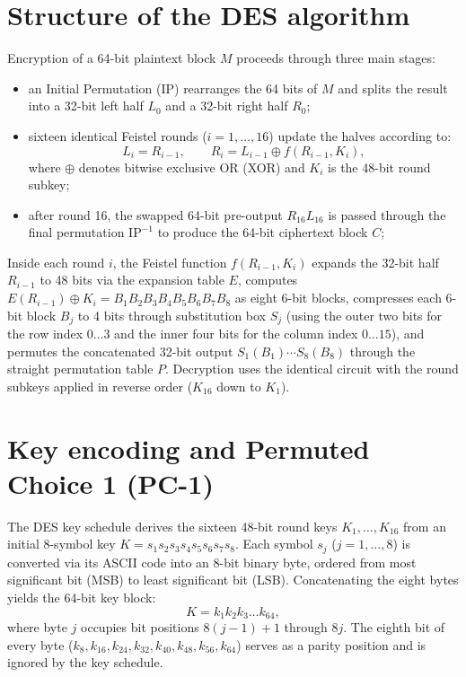 \documentclass{utmreport}
\begin{document}
\section{Structure of the DES algorithm}
Encryption of a 64-bit plaintext block $M$ proceeds through three main stages:
\begin{itemize}
\item an Initial Permutation (IP) rearranges the 64 bits of $M$ and splits the result into a 32-bit left half $L_0$ and a 32-bit right half $R_0$;
\item sixteen identical Feistel rounds ($i=1,\ldots,16$) update the halves according to:
\begin{equation}
L_i = R_{i-1},\qquad R_i = L_{i-1}\oplus f(R_{i-1}, K_i),
\end{equation}
where $\oplus$ denotes bitwise exclusive OR (XOR) and $K_i$ is the 48-bit round subkey;
\item after round 16, the swapped 64-bit pre-output $R_{16}L_{16}$ is passed through the final permutation $\text{IP}^{-1}$ to produce the 64-bit ciphertext block $C$;
\end{itemize}

Inside each round $i$, the Feistel function $f(R_{i-1},K_i)$ expands the 32-bit half $R_{i-1}$ to 48 bits via the expansion table $E$, computes $E(R_{i-1})\oplus K_i = B_1B_2B_3B_4B_5B_6B_7B_8$ as eight 6-bit blocks, compresses each 6-bit block $B_j$ to 4 bits through substitution box $S_j$ (using the outer two bits for the row index $0\ldots3$ and the inner four bits for the column index $0\ldots15$), and permutes the concatenated 32-bit output $S_1(B_1)\cdots S_8(B_8)$ through the straight permutation table $P$. Decryption uses the identical circuit with the round subkeys applied in reverse order ($K_{16}$ down to $K_1$).

\section{Key encoding and Permuted Choice 1 (PC-1)}
The DES key schedule derives the sixteen 48-bit round keys $K_1,\ldots,K_{16}$ from an initial 8-symbol key $K=s_1s_2s_3s_4s_5s_6s_7s_8$. Each symbol $s_j$ ($j=1,\ldots,8$) is converted via its ASCII code into an 8-bit binary byte, ordered from most significant bit (MSB) to least significant bit (LSB). Concatenating the eight bytes yields the 64-bit key block:
\begin{equation}
K = k_1k_2k_3\ldots k_{64},
\end{equation}
where byte $j$ occupies bit positions $8(j-1)+1$ through $8j$. The eighth bit of every byte ($k_8,k_{16},k_{24},k_{32},k_{40},k_{48},k_{56},k_{64}$) serves as a parity position and is ignored by the key schedule.
\end{document}
